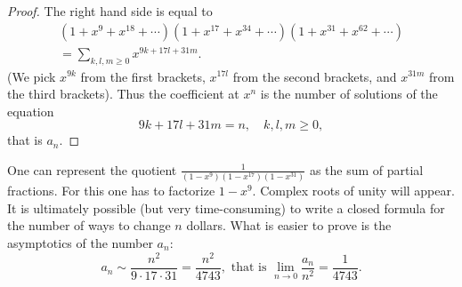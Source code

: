 

\setcounter{section}{3}
\setcounter{subsection}{2}
\setcounter{dfn}{1}

\begin{proof}
The right hand side is equal to
\begin{multline*}
(1 + x^9 + x^{18} + \cdots)(1 + x^{17} + x^{34} + \cdots)(1 + x^{31} + x^{62} + \cdots)\\
= \sum_{k,l,m\ge 0} x^{9k+17l+31m}.
\end{multline*}
(We pick $x^{9k}$ from the first brackets, $x^{17l}$ from the second brackets, and $x^{31m}$ from the third brackets).
Thus the coefficient at $x^n$ is the number of solutions of the equation
\[
9k + 17l + 31m = n, \quad k, l, m \ge 0,
\]
that is $a_n$.
\end{proof}

One can represent the quotient $\frac{1}{(1-x^9)(1-x^{17})(1-x^{31})}$ as the sum of partial fractions.
For this one has to factorize $1-x^9$.
Complex roots of unity will appear.
It is ultimately possible (but very time-consuming) to write a closed formula for the number of ways to change $n$ dollars.
What is easier to prove is the asymptotics of the number $a_n$:
\[
a_n \sim \frac{n^2}{9 \cdot 17 \cdot 31} = \frac{n^2}{4743}, \text{ that is } \lim_{n \to 0} \frac{a_n}{n^2} = \frac{1}{4743}.
\]





